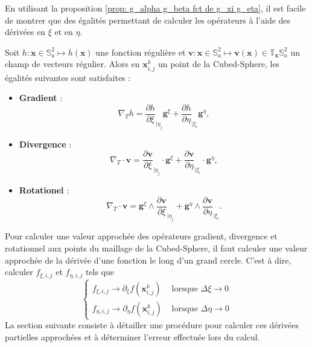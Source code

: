 En utilisant la proposition \ref{prop: g_alpha g_beta fct de g_xi g_eta}, il est facile de montrer que des égalités permettant de calculer les opérateurs à l'aide des dérivées en $\xi$ et en $\eta$.

\begin{theoreme}
Soit $h : \mathbf{x} \in \mathbb{S}_a^2 \mapsto h(\mathbf{x})$ une fonction régulière et $\mathbf{v} : \mathbf{x} \in \mathbb{S}_a^2 \mapsto \mathbf{v}(\mathbf{x}) \in \mathbb{T}_{\mathbf{x}} \mathbb{S}_a^2$ un champ de vecteurs régulier. Alors en $\mathbf{x}_{i,j}^k$ un point de la Cubed-Sphere, les égalités suivantes sont satisfaites :
\begin{itemize}
\item \textbf{Gradient} :
\begin{equation}
\nabla_T h = \dfrac{\partial h}{\partial \xi}_{|\eta_j} \mathbf{g}^{\xi} + \dfrac{\partial h}{\partial \eta}_{|\xi_i} \mathbf{g}^{\eta},
\end{equation}

\item \textbf{Divergence} :
\begin{equation}
\nabla_T \cdot \mathbf{v} = \dfrac{\partial \mathbf{v}}{\partial \xi}_{|\eta_j} \cdot \mathbf{g}^{\xi} + \dfrac{\partial \mathbf{v}}{\partial \eta}_{|\xi_i} \cdot \mathbf{g}^{\eta},
\end{equation}

\item \textbf{Rotationel} :
\begin{equation}
\nabla_T \cdot \mathbf{v} = \mathbf{g}^{\xi} \wedge \dfrac{\partial \mathbf{v}}{\partial \xi}_{|\eta_j} + \mathbf{g}^{\eta} \wedge \dfrac{\partial \mathbf{v}}{\partial \eta}_{|\xi_i}.
\end{equation}
\end{itemize} 
\end{theoreme}

Pour calculer une valeur approchée des opérateurs gradient, divergence et rotationnel aux points du maillage de la Cubed-Sphere, il faut calculer une valeur approchée de la dérivée d'une fonction le long d'un grand cercle. C'est à dire, calculer $f_{\xi,i,j}$ et $f_{\eta,i,j}$ tels que 
\begin{equation}
\left\lbrace
\begin{array}{rl}
f_{\xi,i,j} \rightarrow \partial_{\xi} f ( \mathbf{x}_{i,j}^k) & \text{ lorsque } \Delta \xi \rightarrow 0\\
f_{\eta,i,j} \rightarrow \partial_{\eta} f ( \mathbf{x}_{i,j}^k) & \text{ lorsque } \Delta \eta \rightarrow 0
\end{array}
\right.
\end{equation}
La section suivante consiste à détailler une procédure pour calculer ces dérivées partielles approchées et à déterminer l'erreur effectuée lors du calcul.





